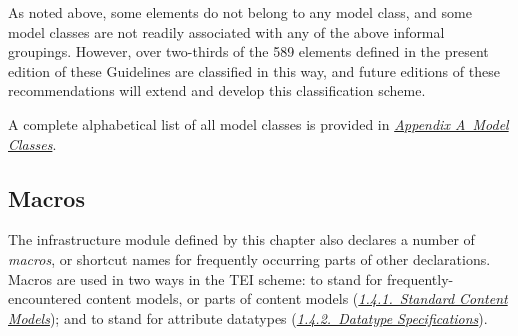 As noted above, some elements do not belong to any model class, and some model classes are not readily associated with any of the above informal groupings. However, over two-thirds of the 589 elements defined in the present edition of these Guidelines are classified in this way, and future editions of these recommendations will extend and develop this classification scheme.\par
A complete alphabetical list of all model classes is provided in \textit{\hyperref[REF-CLASSES-MODEL]{Appendix A\ Model Classes}}.
\subsection[{Macros}]{Macros}\label{STmacros}\par
The infrastructure module defined by this chapter also declares a number of \textit{macros}, or shortcut names for frequently occurring parts of other declarations. Macros are used in two ways in the TEI scheme: to stand for frequently-encountered content models, or parts of content models (\textit{\hyperref[STECST]{1.4.1.\ Standard Content Models}}); and to stand for attribute datatypes (\textit{\hyperref[DTYPES]{1.4.2.\ Datatype Specifications}}).
